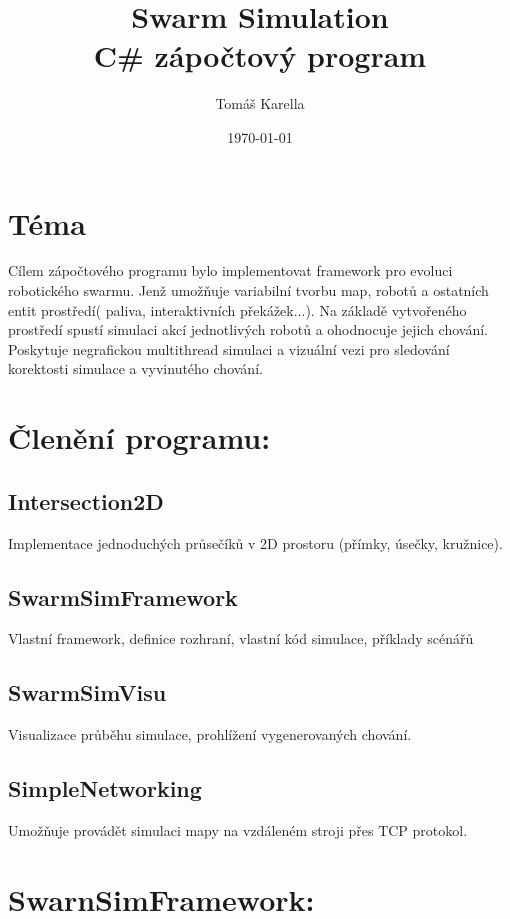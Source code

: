 \documentclass[12pt, oneside]{article}
\title{\vspace{-12ex}Swarm Simulation\\ C\# zápočtový program }
\author{\vspace{-10ex}Tomáš Karella}
\date{\today}
\begin{document}
\maketitle
\section{Téma}
Cílem zápočtového programu bylo implementovat framework pro evoluci robotického swarmu. Jenž umožňuje variabilní tvorbu map, robotů a ostatních entit prostředí( paliva, interaktivních překážek...). Na základě vytvořeného prostředí spustí simulaci akcí jednotlivých robotů a ohodnocuje jejich chování. Poskytuje negrafickou multithread simulaci a vizuální vezi pro sledování korektosti simulace a vyvinutého chování. 
\section{Členění programu:}
\subsection{Intersection2D}
Implementace jednoduchých průsečíků v 2D prostoru (přímky, úsečky, kružnice).
\subsection{SwarmSimFramework} 
Vlastní framework, definice rozhraní, vlastní kód simulace, příklady scénářů
\subsection{SwarmSimVisu} 
Visualizace průběhu simulace, prohlížení vygenerovaných chování. 
\subsection{SimpleNetworking}
Umožňuje provádět simulaci mapy na vzdáleném stroji přes TCP protokol.
\newpage
\section{SwarnSimFramework:}
\end{document}
